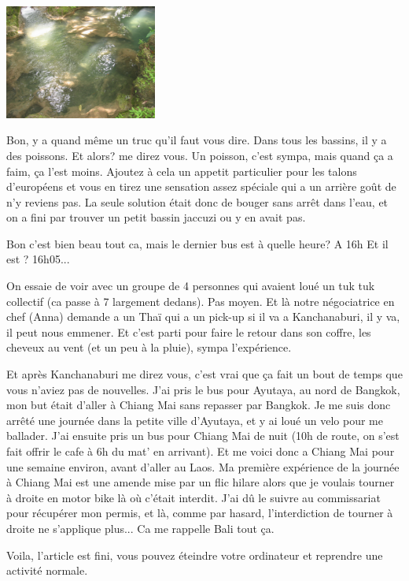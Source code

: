 \begin{multicols}{2}
\smallbreak
\hspace*{-0.65cm}
\includegraphics[width=5cm]{articles/Kanchanaburi/1438.jpg}
\smallbreak

Bon, y a quand même un truc qu'il faut vous dire. Dans tous les bassins, il y a des poissons. Et alors? me direz vous. Un poisson, c'est sympa, mais quand ça a faim, ça l'est moins. Ajoutez à cela un appetit particulier pour les talons d'européens et vous en tirez une sensation assez spéciale qui a un arrière goût de n'y reviens pas. La seule solution était donc de bouger sans arrêt dans l'eau, et on a fini par trouver un petit bassin jaccuzi ou y en avait pas.

\begin{dialogue}
   Bon c'est bien beau tout ca, mais le dernier bus est à quelle heure?
   A 16h
   Et il est ?
   16h05...
\end{dialogue}

On essaie de voir avec un groupe de 4 personnes qui avaient loué un tuk tuk collectif (ca passe à 7 largement dedans). Pas moyen. Et là notre négociatrice en chef (Anna) demande a un Thaï qui a un pick-up si il va a Kanchanaburi, il y va, il peut nous emmener. Et c'est parti pour faire le retour dans son coffre, les cheveux au vent (et un peu à la pluie), sympa l'expérience.

Et après Kanchanaburi me direz vous, c'est vrai que ça fait un bout de temps que vous n'aviez pas de nouvelles. J'ai pris le bus pour Ayutaya, au nord de Bangkok, mon but était d'aller à Chiang Mai sans repasser par Bangkok. Je me suis donc arrêté une journée dans la petite ville d'Ayutaya, et y ai loué un velo pour me ballader. J'ai ensuite pris un bus pour Chiang Mai de nuit (10h de route, on s'est fait offrir le cafe à 6h du mat' en arrivant). Et me voici donc a Chiang Mai pour une semaine environ, avant d'aller au Laos. Ma première expérience de la journée à Chiang Mai est une amende mise par un flic hilare alors que je voulais tourner à droite en motor bike là où c'était interdit. J'ai dû le suivre au commissariat pour récupérer mon permis, et là, comme par hasard, l'interdiction de tourner à droite ne s'applique plus... Ca me rappelle Bali tout ça.

Voila, l'article est fini, vous pouvez éteindre votre ordinateur et reprendre une activité normale.

\end{multicols}


